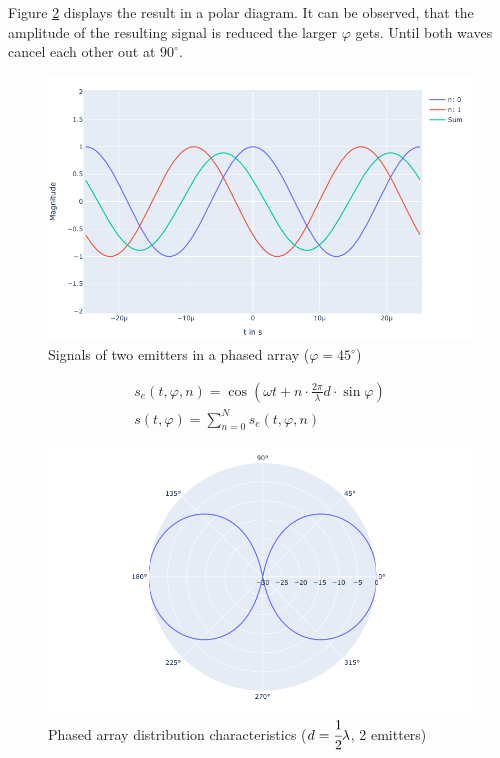 Figure \ref{fig:theory:beam:n2_d.5} displays the result in a polar diagram.\p
%
It can be observed, that the amplitude of the resulting signal is reduced the larger \(\varphi\) gets. Until both waves cancel each other out at \(90^\circ\).
%
\begin{figure}
  \centering
  \includegraphics[height=\mediumheight]{src/assets/pictures/theory/beam_time_n2_45deg.png}
  \caption{Signals of two emitters in a phased array ($\varphi=45^\circ$)}
  \label{fig:theory:beam:time}
\end{figure}
%
\begin{align}
  s_e(t, \varphi, n) = \cos (\omega t + n \cdot \frac{2\pi}{\lambda} d \cdot \sin \varphi )\label{eq:theory:beam:sig}\\[1em]
  s(t, \varphi) = \sum_{n = 0}^{N} s_e(t, \varphi, n)
\end{align}
%
\begin{figure}
  \centering
  \includegraphics[height=\mediumheight]{src/assets/pictures/theory/beam_n2_d0.5.png}
  \caption{Phased array distribution characteristics ($d = \cfrac{1}{2}\lambda$, 2 emitters)}\label{fig:theory:beam:n2_d.5}
\end{figure}
\clearpage
